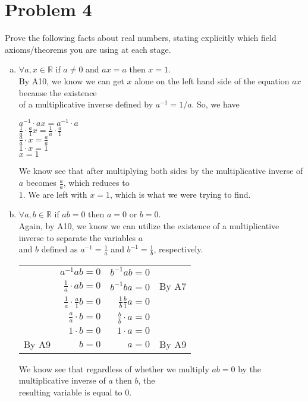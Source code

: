 \documentclass{article}
\begin{document}
\section*{Problem 4}
\begin{flushleft}
Prove the following facts about real numbers, stating explicitly which field axioms/theorems you are using at each stage.
\begin{enumerate}[a)]
\item $\forall a, x \in \mathbb{R}$ if $a \neq 0$ and $ax = a$ then $x=1$.\\
\vspace{.5cm}
\qquad By A10, we know we can get $x$ alone on the left hand side of the equation $ax$ because the existence \\
\qquad of a multiplicative inverse defined by $a^{-1} = 1/a$. So, we have
\begin{center}
$a^{-1} \cdot ax = a^{-1} \cdot a $ \\
$\frac{1}{a} \cdot \frac{a}{1}x = \frac{1}{a} \cdot \frac{a}{1} $ \\
$\frac{a}{a} \cdot x = \frac{a}{a} $ \\
$1 \cdot x = 1 $ \\
$x = 1$
\end{center}
\qquad We know see that after multiplying both sides by the multiplicative inverse of $a$ becomes $\frac{a}{a}$, which reduces to \\
\qquad $1$. We are left with $x=1$, which is what we were trying to find.  

\item $\forall a,b \in \mathbb{R}$ if $ab=0$ then $a=0$ or $b=0$. \\
\vspace{.5cm}
\qquad Again, by A10, we know we can utilize the existence of a multiplicative inverse to separate the variables $a$ \\
\qquad and $b$ defined as $a^{-1} = \frac{1}{a}$ and $b^{-1} = \frac{1}{b}$, respectively. \\
\begin{center}
\begin{tabular}{r r r l}
& $a^{-1} ab = 0 $ & $b^{-1} ab = 0 $ & \\
& $\frac{1}{a} \cdot ab = 0 $ & $b^{-1} ba = 0 $ & By A7\\
& $\frac{1}{a} \cdot \frac{a}{1}b = 0 $ & $\frac{1}{b} \frac{b}{1}a = 0 $ & \\
& $\frac{a}{a} \cdot b = 0 $ & $\frac{b}{b} \cdot a = 0 $ & \\
& $1 \cdot b = 0 $ & $1 \cdot a = 0 $ & \\
By A9 & $b = 0 $ & $a = 0 $ & By A9\\
\end{tabular}
\end{center}
\qquad We know see that regardless of whether we multiply $ab=0$ by the multiplicative inverse of $a$ then $b$, the \\
\qquad resulting variable is equal to $0$. \\


\end{enumerate}
\end{flushleft}
\end{document}
